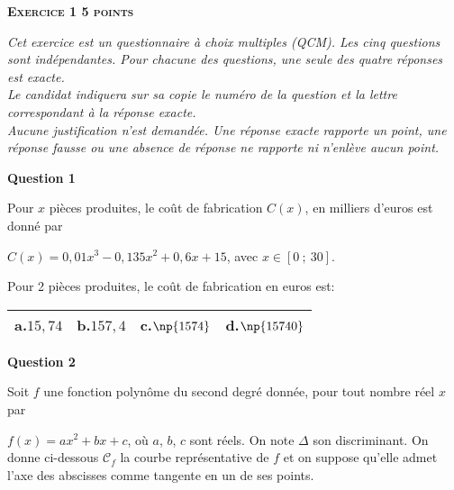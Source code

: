 \textbf{\large\textsc{Exercice 1 \hfill 5 points}}

\bigskip

\emph{Cet exercice est un questionnaire à choix multiples (QCM). Les cinq questions sont indépendantes. Pour chacune des questions, une seule des quatre réponses est exacte.\\
Le candidat indiquera sur sa copie le numéro de la question et la lettre correspondant à la réponse exacte.\\
Aucune justification n'est demandée. Une réponse exacte rapporte un point, une réponse fausse ou une absence de réponse ne rapporte ni n'enlève aucun point.}

\bigskip

\textbf{Question 1}

\medskip

Pour $x$ pièces produites, le coût de fabrication $C(x)$, en milliers d'euros est donné par

$C(x)= 0,01x^3 - 0,135x^2 + 0,6x +15$, avec $x\in [0~;~30]$.

Pour 2 pièces produites, le coût de fabrication en euros est:

\medskip

{\renewcommand{\arraystretch}{1.5}
\begin{tabularx}{\linewidth}{|X|X|X|X|}
\hline
\textbf{a.}\quad $15,74$ &  \textbf{b.}\quad $157,4$ &  \textbf{c.}\quad $\np{1574}$ &  \textbf{d.}\quad $\np{15740}$\\
\hline
\end{tabularx}}

\bigskip

\textbf{Question 2}

\medskip

Soit $f$ une fonction polynôme du second degré donnée, pour tout nombre réel $x$ par

$f(x)= ax^2+bx+c$, où $a$, $b$, $c$ sont réels. On note $\Delta$ son discriminant. On donne ci-dessous $\mathcal{C}_f$ la courbe représentative de $f$ et on suppose qu'elle admet l'axe des abscisses comme tangente en un de ses points.

\begin{center}
\end{center}

